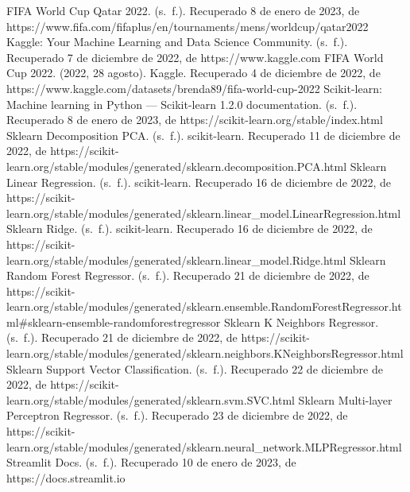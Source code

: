 \begin{thebibliography}{X}
     FIFA World Cup Qatar 2022. (s. f.). Recuperado 8 de enero de 2023, de https://www.fifa.com/fifaplus/en/tournaments/mens/worldcup/qatar2022
     Kaggle: Your Machine Learning and Data Science Community. (s. f.). Recuperado 7 de diciembre de 2022, de https://www.kaggle.com
     FIFA World Cup 2022. (2022, 28 agosto). Kaggle. Recuperado 4 de diciembre de 2022, de https://www.kaggle.com/datasets/brenda89/fifa-world-cup-2022
     Scikit-learn: Machine learning in Python — Scikit-learn 1.2.0 documentation. (s. f.). Recuperado 8 de enero de 2023, de https://scikit-learn.org/stable/index.html
     Sklearn Decomposition PCA. (s. f.). scikit-learn. Recuperado 11 de diciembre de 2022, de https://scikit-learn.org/stable/modules/generated/sklearn.decomposition.PCA.html
     Sklearn Linear Regression. (s. f.). scikit-learn. Recuperado 16 de diciembre de 2022, de https://scikit-learn.org/stable/modules/generated/sklearn.linear\_model.LinearRegression.html
     Sklearn Ridge. (s. f.). scikit-learn. Recuperado 16 de diciembre de 2022, de https://scikit-learn.org/stable/modules/generated/sklearn.linear\_model.Ridge.html
     Sklearn Random Forest Regressor. (s. f.). Recuperado 21 de diciembre de 2022, de https://scikit-learn.org/stable/modules/generated/sklearn.ensemble.RandomForestRegressor.html\#sklearn-ensemble-randomforestregressor
     Sklearn K Neighbors Regressor. (s. f.). Recuperado 21 de diciembre de 2022, de https://scikit-learn.org/stable/modules/generated/sklearn.neighbors.KNeighborsRegressor.html
     Sklearn Support Vector Classification. (s. f.). Recuperado 22 de diciembre de 2022, de https://scikit-learn.org/stable/modules/generated/sklearn.svm.SVC.html
     Sklearn Multi-layer Perceptron Regressor. (s. f.). Recuperado 23 de diciembre de 2022, de https://scikit-learn.org/stable/modules/generated/sklearn.neural\_network.MLPRegressor.html
     Streamlit Docs. (s. f.). Recuperado 10 de enero de 2023, de https://docs.streamlit.io
\end{thebibliography}

\newpage